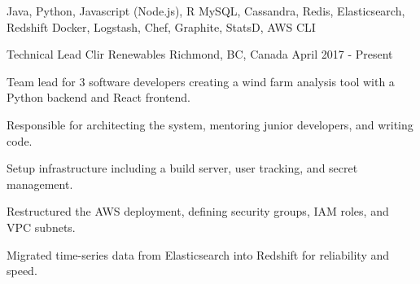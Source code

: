 \begin{cvskills}
   {Java, Python, Javascript (Node.js), R}
   {MySQL, Cassandra, Redis, Elasticsearch, Redshift}
   {Docker, Logstash, Chef, Graphite, StatsD, AWS CLI}
\end{cvskills}




\begin{cventries}

  \cventry
    {Technical Lead} %
    {Clir Renewables} %
    {Richmond, BC, Canada} %
    {April 2017 - Present} %
    {
      \begin{cvitems} %
        \item {Team lead for 3 software developers creating a wind farm analysis tool with a Python backend and React frontend.}
        \item {Responsible for architecting the system, mentoring junior developers, and writing code.}
        \item {Setup infrastructure including a build server, user tracking, and secret management.}
        \item {Restructured the AWS deployment, defining security groups, IAM roles, and VPC subnets.}
        \item {Migrated time-series data from Elasticsearch into Redshift for reliability and speed.}
      \end{cvitems}
    }



\end{cventries}
